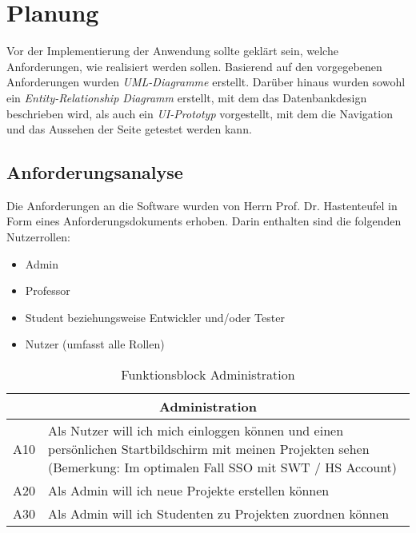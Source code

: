 \documentclass[11pt,a4paper]{report}
\begin{document}
\chapter{Planung} \label{chap:Anforderungen}
Vor der Implementierung der Anwendung sollte geklärt sein, welche Anforderungen, wie realisiert werden sollen. Basierend auf den vorgegebenen Anforderungen wurden \textit{UML-Diagramme} erstellt. Darüber hinaus wurden sowohl ein \textit{Entity-Relationship Diagramm} erstellt, mit dem das Datenbankdesign beschrieben wird, als auch ein \textit{UI-Prototyp} vorgestellt, mit dem die Navigation und das Aussehen der Seite getestet werden kann.


\section{Anforderungsanalyse} \label{c:Anf}


Die Anforderungen an die Software wurden von Herrn Prof. Dr. Hastenteufel in Form eines Anforderungsdokuments erhoben. Darin enthalten sind die folgenden Nutzerrollen: 

\begin{itemize}
\setlength\itemsep{0.1em}
\item Admin

\item Professor

\item Student beziehungsweise Entwickler und/oder Tester

\item Nutzer (umfasst alle Rollen)

\end{itemize}


\begin{table}[htpb]
\caption{Funktionsblock Administration}
\begin{center}
\begin{tabular}{|p{}|p{}|}
    \hline
    \multicolumn{2}{|c|}{Administration}\\
    \hline
    A10 & Als Nutzer will ich mich einloggen können und einen 				persönlichen Startbildschirm mit meinen
	Projekten sehen
	(Bemerkung: Im optimalen Fall SSO mit SWT / HS Account)\\
	\hline
    A20 & Als Admin will ich neue Projekte erstellen können\\
    \hline
    A30 & Als Admin will ich Studenten zu Projekten zuordnen können		\\
    \hline
\end{tabular}
\end{center}
\label{t:funkadmin}
\end{table}
\end{document}
